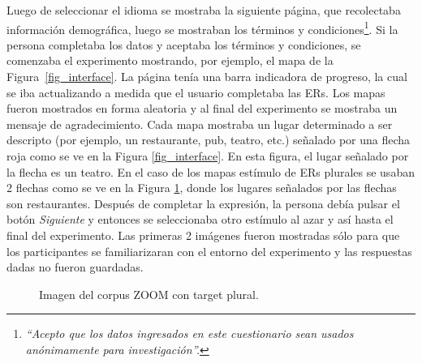 Luego de seleccionar el idioma se mostraba la siguiente p\'agina, que recolectaba informaci\'on demogr\'afica, luego se mostraban los t\'erminos y condiciones\footnote{%
   \emph{ ``Acepto que los datos ingresados en este cuestionario sean usados an\'onimamente para investigaci\'on''.}
  }. 
Si la persona completaba los datos y aceptaba los t\'erminos y condiciones, se comenzaba el experimento mostrando, por ejemplo, el mapa de la Figura~\ref{fig_interface}.
La p\'agina ten\'{i}a una barra indicadora de progreso, la cual se iba actualizando a medida que el usuario completaba las ERs. Los mapas fueron mostrados en forma aleatoria y al final del experimento se mostraba un mensaje de agradecimiento.
Cada mapa mostraba un lugar determinado a ser descripto (por ejemplo, un restaurante, pub, teatro, etc.) se\~nalado por una flecha roja como se ve en la Figura \ref{fig_interface}. En esta figura, el lugar se\~nalado por la flecha es un teatro. En el caso de los mapas est\'imulo de ERs plurales se usaban 2 flechas como se ve en la Figura \ref{mapa20-5}, donde los lugares se\~nalados por las flechas son restaurantes. Despu\'es de completar la expresi\'on, la persona deb\'ia pulsar el bot\'on \emph{Siguiente} y entonces se seleccionaba otro est\'{i}mulo al azar y as\'{i} hasta el final del experimento. Las primeras 2 im\'agenes fueron mostradas s\'olo para que los participantes se familiarizaran con el entorno del experimento y las respuestas dadas no fueron guardadas.

\begin{figure}[h]
\begin{center}
\caption{Imagen del corpus ZOOM con target plural.}
\label{mapa20-5}
\end{center}
\end{figure}




